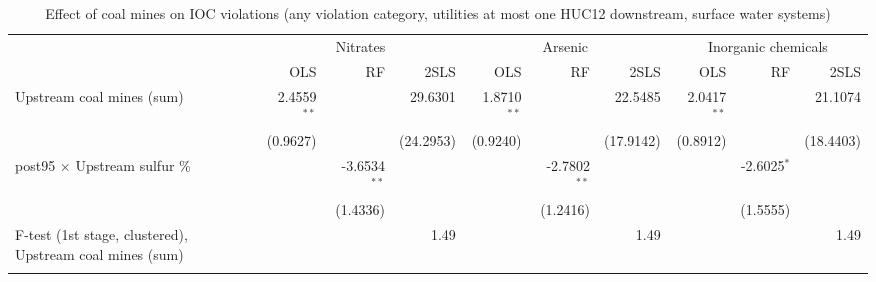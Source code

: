 
\begin{table}[htbp]
   
   \caption{\label{2sls_dwnstrm_minevio_allcat_ivsum_binvio_surfacewater} Effect of coal mines on IOC violations (any violation category, utilities at most one HUC12 downstream, surface water systems)}
   \bigskip
   
   \centering
   
   \begin{adjustbox}{width = \textwidth, center}
      
      
      \begin{tabular}{lrrrrrrrrr}
         \toprule
         
          & \multicolumn{3}{c}{Nitrates} & \multicolumn{3}{c}{Arsenic} & \multicolumn{3}{c}{Inorganic chemicals}\\
         
                                                                  & OLS           & RF             & 2SLS      & OLS           & RF             & 2SLS      & OLS           & RF            & 2SLS\\  
         
         \midrule 
         Upstream coal mines (sum)                                & 2.4559$^{**}$ &                & 29.6301   & 1.8710$^{**}$ &                & 22.5485   & 2.0417$^{**}$ &               & 21.1074\\   
                                                                  & (0.9627)      &                & (24.2953) & (0.9240)      &                & (17.9142) & (0.8912)      &               & (18.4403)\\   
         post95 $\times$ Upstream sulfur \%                       &               & -3.6534$^{**}$ &           &               & -2.7802$^{**}$ &           &               & -2.6025$^{*}$ &   \\   
                                                                  &               & (1.4336)       &           &               & (1.2416)       &           &               & (1.5555)      &   \\   
         
         F-test (1st stage, clustered), Upstream coal mines (sum) &               &                & 1.49      &               &                & 1.49      &               &               & 1.49\\  
         
          \\
         

\end{tabular}
\end{adjustbox}
\end{table}
